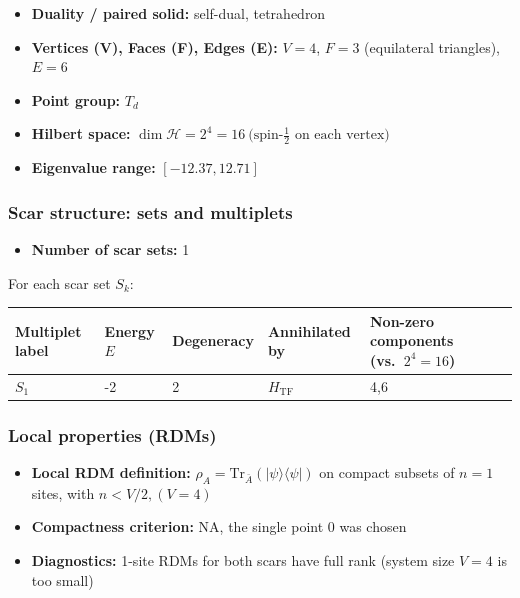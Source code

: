 \documentclass[11pt,a4paper]{article}
\newcommand{\Htf}{H_{\mathrm{TF}}}
\begin{document}
\begin{itemize}[leftmargin=1.5em]
  \item \textbf{Duality / paired solid:} self-dual, tetrahedron
  \item \textbf{Vertices (V), Faces (F), Edges (E):} $V = 4$,\; $F = 3$ (equilateral triangles),\; $E = 6$
  \item \textbf{Point group:} $T_d$
  \item \textbf{Hilbert space:} \(
        \dim\mathcal{H} = 2^{4} = 16\ \text{(spin-$\tfrac12$ on each vertex)}
        \)
  \item \textbf{Eigenvalue range:} $[-12.37, 12.71]$
\end{itemize}

\subsubsection*{Scar structure: sets and multiplets}

\begin{itemize}[leftmargin=1.5em]
  \item \textbf{Number of scar sets:} 1
  \end{itemize}
  \hspace{6mm}For each scar set $S_k$:\\

\begin{center}
\begin{tabular}{L{3.5cm} C{2.2cm} C{2.2cm} C{2.2cm} C{3.0cm} C{3.2cm}}
\toprule
\textbf{Multiplet label} & \textbf{Energy $E$} & \textbf{Degeneracy} & \textbf{Annihilated by} & \textbf{Non-zero components (vs.\ $2^{4} = 16$)} \\
\midrule
$S_1$ & -2 & 2 & $\Htf$ & 4,6 \\
\bottomrule
\end{tabular}
\end{center}

\subsubsection*{Local properties (RDMs)}

\begin{itemize}[leftmargin=1.5em]
  \item \textbf{Local RDM definition:} $\rho_A=\mathrm{Tr}_{\bar A}(|\psi\rangle\langle\psi|)$ on compact subsets of $n=1$ sites, with $n < V/2, (V = 4)$
  \item \textbf{Compactness criterion:} NA, the single point ${0}$ was chosen
  \item \textbf{Diagnostics:} 1-site RDMs for both scars have full rank (system size $V=4$ is too small)
\end{itemize}
\end{document}
